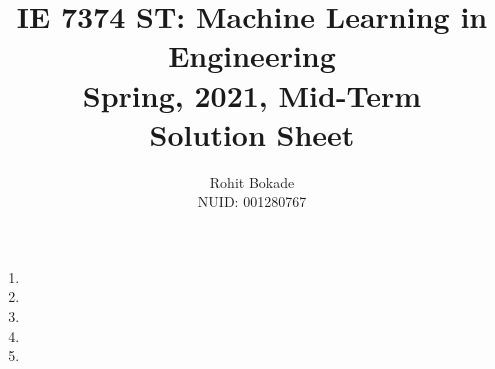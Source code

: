 \documentclass[11pt]{article}
\title{IE 7374 ST: Machine Learning in Engineering \\ Spring, 2021, Mid-Term \\ Solution Sheet}
\author{Rohit Bokade \\ NUID: 001280767}
\begin{document}
	
	\maketitle 
	\begin{enumerate}
		\item 
		\item 
		\item 
		\item 	
		\item 
	\end{enumerate}
\end{document}
